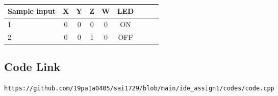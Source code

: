 \documentclass[10pt, a4paper]{article}
\begin{document}
\begin{table}[htbp]
 \begin{center}
    \begin{tabular}{|l|c|c|c|c|c|c|c|c} \hline \textbf{Sample input}
  & \textbf{X} & \textbf{Y} & \textbf{Z}& \textbf{W}& \textbf{LED } \\
 \hline
1&0&0&0&0&ON\\ \hline
2&0&0&1&0&OFF \\ \hline
\end{tabular}   
\end{center}
\caption{\label{table:dummytable} }
\end{table}

\subsection{Code Link}
\vspace{5mm}
\begin{lstlisting}
https://github.com/19pa1a0405/sai1729/blob/main/ide_assign1/codes/code.cpp
\end{lstlisting}
\end{document}
